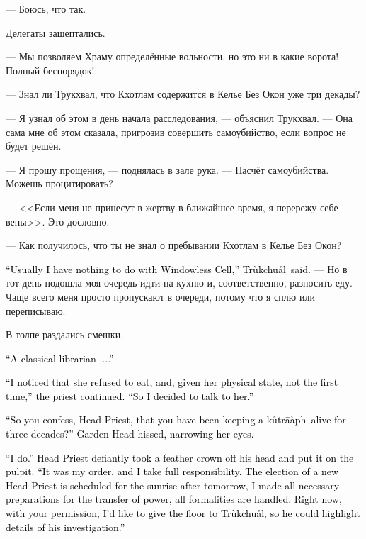 \documentclass[a4paper,10pt,fleqn]{book}\usepackage{cooltooltips}\usepackage{polyglossia}\setdefaultlanguage{english}\setotherlanguage{russian}\defaultfontfeatures{Ligatures=TeX,Mapping=tex-text} \usepackage{xcolor}\definecolor{lightgray}{HTML}{bbbbbb}\color{lightgray}\newcommand{\ml}[3]{\textcolor{black}{#3}}
\newcommand{\kutraph}{k\r{u}tr\={a}\`{a}ph}
\newcommand{\Trukchual}{Tr\`{u}kchu\r{a}l}
\begin{document}
--- Боюсь, что так.

Делегаты зашептались.

--- Мы позволяем Храму определённые вольности, но это ни в какие ворота!
Полный беспорядок!

--- Знал ли Трукхвал, что Кхотлам содержится в Келье Без Окон уже три декады?

--- Я узнал об этом в день начала расследования, --- объяснил Трукхвал.
--- Она сама мне об этом сказала, пригрозив совершить самоубийство, если вопрос не будет решён.

--- Я прошу прощения, --- поднялась в зале рука.
--- Насчёт самоубийства.
Можешь процитировать?

--- <<Если меня не принесут в жертву в ближайшее время, я перережу себе вены>>.
Это дословно.

--- Как получилось, что ты не знал о пребывании Кхотлам в Келье Без Окон?

\ml{$0$}
{--- Обычно я не имею никакого отношения к Келье Без Окон, --- сказал Трукхвал.}
{``Usually I have nothing to do with Windowless Cell,'' \Trukchual\ said.}
--- Но в тот день подошла моя очередь идти на кухню и, соответственно, разносить еду.
Чаще всего меня просто пропускают в очереди, потому что я сплю или переписываю.

В толпе раздались смешки.

\ml{$0$}
{--- Типичный библиотекарь...}
{``A classical librarian ....''}

\ml{$0$}
{--- Я обратил внимание, что она отказалась от еды, и судя по её состоянию, уже не впервые, --- продолжил жрец.}
{``I noticed that she refused to eat, and, given her physical state, not the first time,'' the priest continued.}
\ml{$0$}
{--- Поэтому решил поговорить.}
{``So I decided to talk to her.''}

\ml{$0$}
{--- Так, значит, Первый жрец, ты признаёшь, что держал кутрапа живым три декады? --- сузив глаза, прошипела старшина Сада.}
{``So you confess, Head Priest, that you have been keeping a \kutraph\ alive for three decades?'' Garden Head hissed, narrowing her eyes.}

\ml{$0$}
{--- Признаю, --- Первый демонстративно снял перьевую корону и положил на кафедру.}
{``I do.'' Head Priest defiantly took a feather crown off his head and put it on the pulpit.}
\ml{$0$}
{--- Это был мой приказ, и ответственность лежит на мне.}
{``It was my order, and I take full responsibility.}
\ml{$0$}
{Выборы нового Первого жреца уже назначены на послезавтра, все необходимые для передачи полномочий приготовления мной сделаны и формальности соблюдены.}
{The election of a new Head Priest is scheduled for the sunrise after tomorrow, I made all necessary preparations for the transfer of power, all formalities are handled.}
\ml{$0$}
{Сейчас же, с вашего позволения, я хочу дать слово Трукхвалу, чтобы он осветил подробности своего расследования.}
{Right now, with your permission, I'd like to give the floor to \Trukchual, so he could highlight details of his investigation.''}
\end{document}
